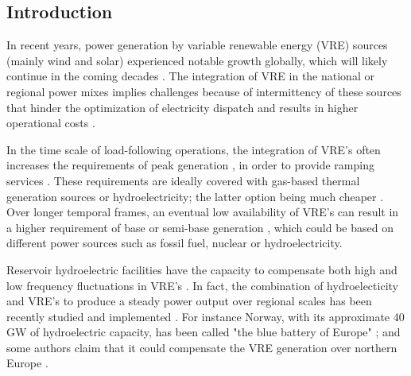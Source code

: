 \documentclass[AMA,Times1COL]{WileyNJDv5} %
\begin{document}
\begin{linenumbers}



\maketitle



\section{Introduction}\label{sec1}

In recent years, power generation by variable renewable energy (VRE) sources (mainly wind and solar) experienced notable growth globally, which will likely continue in the coming decades \cite{ren212020global}. The integration of VRE in the national or regional power mixes implies challenges because of intermittency of these sources \cite{cosseron2013characterization, franccois2014integrating, grams2017balancing} that hinder the optimization of electricity dispatch and results in higher operational costs \cite{albadi2010overview}.

In the time scale of load-following operations, the integration of VRE's often increases the requirements of peak generation \cite{widen2011correlations}, in order to provide ramping services . These requirements are ideally covered with gas-based thermal generation sources or hydroelectricity; the latter option being much cheaper \cite{acker2012integration, peter2017energy}. Over longer temporal frames, an eventual low availability of VRE's can result in a higher requirement of base or semi-base generation \cite{wan1993factors,franccois2017assessing}, which could be based on different power sources such as fossil fuel, nuclear or hydroelectricity. 

Reservoir hydroelectric facilities have the capacity to compensate both high and low frequency fluctuations in VRE's \cite{wan1993factors,franccois2017assessing}. In fact, the combination of hydroelecticity and VRE's to produce a steady power output over regional scales has been recently studied and implemented \cite{chakrabarti2011wind, chakrabarti2012balancing}. For instance Norway, with its approximate 40 GW of hydroelectric capacity, has been called "the blue battery of Europe" \cite{danielo2013norway}; and some authors claim that it could compensate the VRE generation over northern Europe \cite{graabak2017norway}. 


\end{linenumbers}
\end{document}
